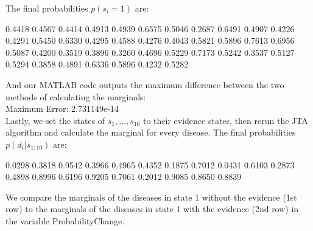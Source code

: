 \documentclass[11pt,a4paper,oneside]{report}
\begin{document}
The final probabilities $p(s_i = 1)$ are:

    0.4418
    0.4567
    0.4414
    0.4913
    0.4939
    0.6575
    0.5046
    0.2687
    0.6491
    0.4907
    0.4226
    0.4291
    0.5450
    0.6330
    0.4295
    0.4588
    0.4276
    0.4043
    0.5821
    0.5896
    0.7613
    0.6956
    0.5087
    0.4200
    0.3519
    0.3896
    0.3260
    0.4696
    0.5229
    0.7173
    0.5242
    0.3537
    0.5127
    0.5294
    0.3858
    0.4891
    0.6336
    0.5896
    0.4232
    0.5282

And our MATLAB code outputs the maximum difference between the two methods of calculating the marginals:\\

Maximum Error: 2.731149e-14\\

Lastly, we set the states of $s_1,...,s_{10}$ to their evidence states, then rerun the JTA algorithm and calculate the marginal for every disease. The final probabilities $p(d_i | s_{1:10})$ are:

    0.0298
    0.3818
    0.9542
    0.3966
    0.4965
    0.4352
    0.1875
    0.7012
    0.0431
    0.6103
    0.2873
    0.4898
    0.8996
    0.6196
    0.9205
    0.7061
    0.2012
    0.9085
    0.8650
    0.8839


We compare the marginals of the diseases in state 1 without the evidence (1st row) to the marginals of the diseases in state 1 with the evidence (2nd row) in the variable ProbabilityChange. \\
\end{document}
